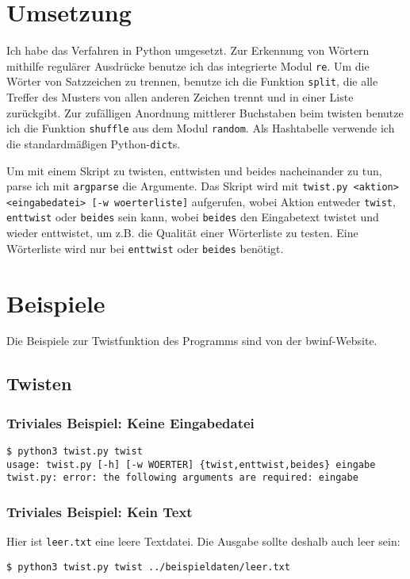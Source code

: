 \documentclass[a4paper,10pt,ngerman]{scrartcl}
\begin{document}
\section{Umsetzung}
Ich habe das Verfahren in Python umgesetzt. Zur Erkennung von Wörtern mithilfe regulärer Ausdrücke benutze ich das integrierte Modul \texttt{re}. Um die Wörter von Satzzeichen zu trennen, benutze ich die Funktion \texttt{split}, die alle Treffer des Musters von allen anderen Zeichen trennt und in einer Liste zurückgibt. Zur zufälligen Anordnung mittlerer Buchstaben beim twisten benutze ich die Funktion \texttt{shuffle} aus dem Modul \texttt{random}. Als Hashtabelle verwende ich die standardmäßigen Python-\texttt{dict}s. 

Um mit einem Skript zu twisten, enttwisten und beides nacheinander zu tun, parse ich mit \texttt{argparse} die Argumente. Das Skript wird mit \texttt{twist.py <aktion> <eingabedatei> [-w woerterliste]} aufgerufen, wobei Aktion entweder \texttt{twist}, \texttt{enttwist} oder \texttt{beides} sein kann, wobei \texttt{beides} den Eingabetext twistet und wieder enttwistet, um z.B. die Qualität einer Wörterliste zu testen. Eine Wörterliste wird nur bei \texttt{enttwist} oder \texttt{beides} benötigt.

\section{Beispiele}
Die Beispiele zur Twistfunktion des Programms sind von der bwinf-Website.

\subsection{Twisten}
\label{beispiel:twisten}


\subsubsection{Triviales Beispiel: Keine Eingabedatei}
\begin{lstlisting}[breaklines=true]
$ python3 twist.py twist
usage: twist.py [-h] [-w WOERTER] {twist,enttwist,beides} eingabe
twist.py: error: the following arguments are required: eingabe
\end{lstlisting}


\subsubsection{Triviales Beispiel: Kein Text}
Hier ist \texttt{leer.txt} eine leere Textdatei. Die Ausgabe sollte deshalb auch leer sein:
\begin{lstlisting}[breaklines=true]
$ python3 twist.py twist ../beispieldaten/leer.txt

\end{lstlisting}
\end{document}
